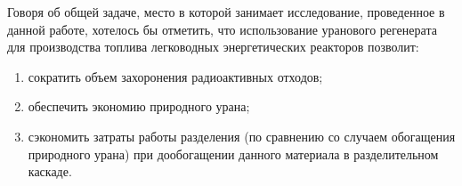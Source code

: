 Говоря об общей задаче, место в которой занимает исследование, проведенное в данной работе, хотелось бы отметить, что использование уранового регенерата для производства топлива легководных энергетических реакторов позволит: 
\begin{enumerate}
  \item сократить объем захоронения радиоактивных отходов; 
  \item обеспечить экономию природного урана;
  \item сэкономить затраты работы разделения (по сравнению со случаем обогащения природного урана) при дообогащении данного материала в разделительном каскаде. 
\end{enumerate}
